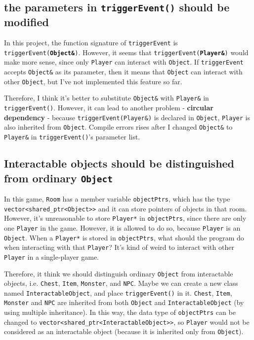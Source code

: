 \documentclass{article}
\begin{document}
    \subsection{the parameters in \texttt{triggerEvent()} should be modified}
    In this project, the function signature of \texttt{triggerEvent} is \texttt{triggerEvent(\textbf{Object\&})}. However, it seems that \texttt{triggerEvent(\textbf{Player\&})} would make more sense, since only \texttt{Player} can interact with \texttt{Object}. If \texttt{triggerEvent} accepts \texttt{Object\&} as its parameter, then it means that \texttt{Object} can interact with other \texttt{Object}, but I've not implemented this feature so far.
    \par
    Therefore, I think it's better to substitute \texttt{Object\&} with \texttt{Player\&} in \texttt{triggerEvent()}. However, it can lead to another problem - \textbf{circular dependency} - because \texttt{triggerEvent(Player\&)} is declared in \texttt{Object}, \texttt{Player} is also inherited from \texttt{Object}. Compile errors rises after I changed \texttt{Object\&} to \texttt{Player\&} in \texttt{triggerEvent()}'s parameter list.
    
    \subsection{Interactable objects should be distinguished from ordinary \texttt{Object}}
    In this game, \texttt{Room} has a member variable \texttt{objectPtrs}, which has the type \texttt{vector<shared\_ptr<Object>>} and it can store pointers of objects in that room. However, it's unreasonable to store \texttt{Player*} in \texttt{objectPtrs}, since there are only one \texttt{Player} in the game. However, it is allowed to do so, because \texttt{Player} is an \texttt{Object}. When a \texttt{Player*} is stored in \texttt{objectPtrs}, what should the program do when interacting with that \texttt{Player}? It's kind of weird to interact with other \texttt{Player} in a single-player game.
    \par
    Therefore, it think we should distinguish ordinary \texttt{Object} from interactable objects, i.e. \texttt{Chest}, \texttt{Item}, \texttt{Monster}, and \texttt{NPC}. Maybe we can create a new class named \texttt{InteractableObject}, and place \texttt{triggerEvent()} in it. \texttt{Chest}, \texttt{Item}, \texttt{Monster} and \texttt{NPC} are inherited from both \texttt{Object} and \texttt{InteractableObject} (by using multiple inheritance). In this way, the data type of \texttt{objectPtrs} can be changed to \texttt{vector<shared\_ptr<InteractableObject>>}, so \texttt{Player} would not be considered as an interactable object (because it is inherited only from \texttt{Object}).
\end{document}
